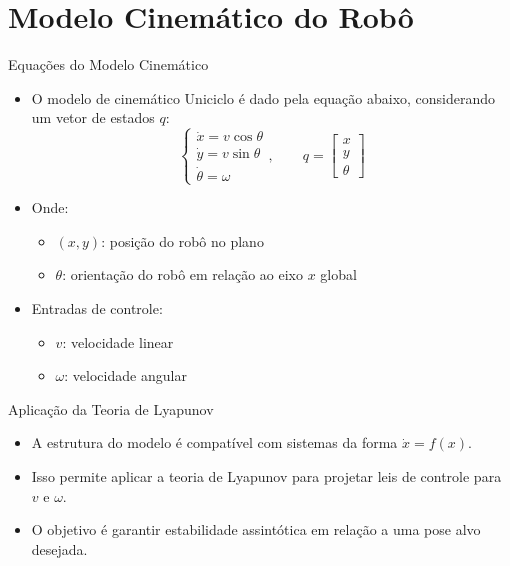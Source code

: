 \documentclass{beamer}
\begin{document}
\section{Modelo Cinemático do Robô}

\begin{frame}{Equações do Modelo Cinemático}
  \begin{itemize}
    \item O modelo de cinemático Uniciclo é dado pela equação abaixo, considerando um vetor de estados $q$:
    \[
    \begin{cases}
        \dot{x} = v \cos \theta \\
        \dot{y} = v \sin \theta \\
        \dot{\theta} = \omega
    \end{cases},\quad \quad
    q = \begin{bmatrix} x \\ y \\ \theta \end{bmatrix}
    \]
    \item Onde:
    \begin{itemize}
      \item $(x, y)$: posição do robô no plano
      \item $\theta$: orientação do robô em relação ao eixo $x$ global
    \end{itemize}
    \item Entradas de controle:
    \begin{itemize}
      \item $v$: velocidade linear
      \item $\omega$: velocidade angular
    \end{itemize}
  \end{itemize}
\end{frame}
\begin{frame}{Aplicação da Teoria de Lyapunov}
  \begin{itemize}
    \item A estrutura do modelo é compatível com sistemas da forma $\dot{x} = f(x)$.
    \item Isso permite aplicar a teoria de Lyapunov para projetar leis de controle para $v$ e $\omega$.
    \item O objetivo é garantir estabilidade assintótica em relação a uma pose alvo desejada.
  \end{itemize}
\end{frame}
\end{document}
